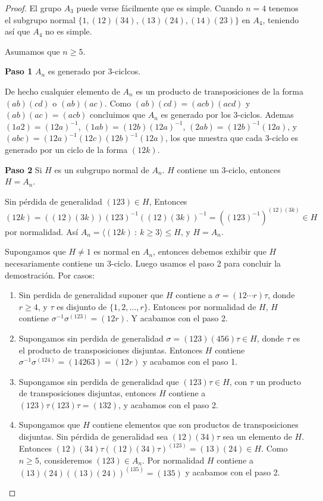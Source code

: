 \documentclass[letterpaper]{article}
\begin{document}
\begin{proof}
El grupo $A_3$ puede verse fácilmente que es simple. Cuando $n = 4$ tenemos el subgrupo normal
$\{ 1, (12)(34), (13)(24), (14)(23) \}$ en $A_4$, teniendo así que $A_4$ no es simple.

Asumamos que $n \geq 5$.

\textbf{Paso 1} $A_n$ es generado por 3-ciclcos.

De hecho cualquier elemento de $A_n$ es un producto de transposiciones de la forma $(ab)(cd)$ o $(ab)(ac)$.
Como $(ab)(cd) = (acb)(acd)$ y $(ab)(ac)=(acb)$ concluimos que $A_n$ es generado por los 3-ciclos.
Ademas $(1a2)=(12a)^{-1}$, $(1ab)=(12b)(12a)^{-1}$, $(2ab)=(12b)^{-1}(12a)$, y
$(abc)=(12a)^{-1}(12c)(12b)^{-1}(12a)$, los que muestra que cada 3-ciclo es generado por un ciclo de la
forma $(12k)$.


\textbf{Paso 2} Si $H$ es un subgrupo normal de $A_n$. $H$ contiene un 3-ciclo, entonces $H = A_n$.

Sin pérdida de generalidad $(123) \in H$, Entonces
$(12k) = ((12)(3k))(123)^{-1}((12)(3k))^{-1} = ((123)^{-1})^{(12)(3k)} \in H$ por normalidad. Así
$A_n = \langle (12k) \ : \ k \geq 3 \rangle \leq H$, y $H = A_n$.

Supongamos que $H \neq 1$ es normal en $A_n$, entonces debemos exhibir que $H$ necesariamente contiene un
3-ciclo. Luego usamos el paso 2 para concluir la demostración. Por casos:
\begin{enumerate}
    \item Sin perdida de generalidad suponer que $H$ contiene a $\sigma = (1 2 \cdots r)\tau$, donde
    $r \geq 4$, y $\tau$ es disjunto de $\{ 1,2,\ldots,r \}$. Entonces por normalidad de $H$, $H$ contiene
    $\sigma^{-1}\sigma^{(123)} = (12r)$. Y acabamos con el paso 2.

    \item Supongamos sin perdida de generalidad $\sigma = (123)(456)\tau \in H$, donde $\tau$ es el
    producto de transposiciones disjuntas. Entonces $H$ contiene $\sigma^{-1}\sigma^{(124)} = (14263) = (12r)$
    y acabamos con el paso 1.

    \item Supongamos sin perdida de generalidad que $(123)\tau \in H$, con $\tau$ un producto de
    transposiciones disjuntas, entonces $H$ contiene a $(123)\tau(123)\tau = (132)$, y acabamos con el paso 2.

    \item Supongamos que $H$ contiene elementos que son productos de transposiciones disjuntas. Sin pérdida de
    generalidad sea $(12)(34)\tau$ sea un elemento de $H$. Entonces
    $(12)(34)\tau((12)(34)\tau)^{(123)} = (13)(24) \in H$. Como $n \geq 5$, consideremos $(123) \in A_n$. Por
    normalidad $H$ contiene a $(13)(24)((13)(24))^{(135)} = (135)$ y acabamos con el paso 2.
\end{enumerate}


\end{proof}
\end{document}
